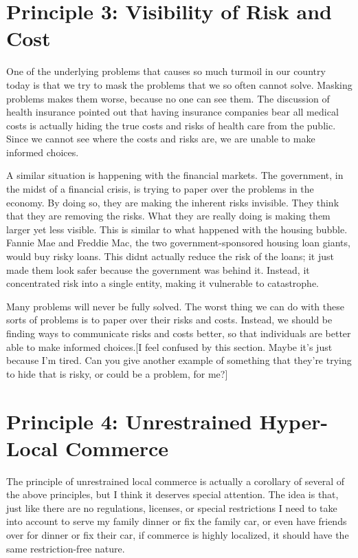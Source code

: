 \section{Principle 3: Visibility of Risk and Cost}

One of the underlying problems that causes so much turmoil in our
country today is that
we try to mask the
problems that we so often cannot solve.  Masking problems makes them
worse, because no one can see them. The discussion of health insurance
pointed out that having insurance companies bear all medical costs is
actually hiding the true costs and risks of health care from the
public. Since we cannot see where the costs and risks are, we are
unable to make informed choices.


A similar situation is happening with the financial markets. The
government, in the midst of
a financial crisis,
is trying to paper over the problems in the economy. By doing so, they
are making the inherent risks invisible. They think that they are
removing the risks. What they are really doing is making them larger
yet less visible. This is similar to what happened with the housing
bubble. Fannie Mae and Freddie Mac, the two government-sponsored
housing loan giants, would buy risky loans. This
didn{\textquotesingle}t actually reduce the risk of the loans; it just
made them look safer because the government was behind it. Instead, it
concentrated risk into a single entity, making it vulnerable to
catastrophe.


Many problems will never be fully solved. The worst thing we can do with
these sorts of problems is to paper over their risks and costs.
Instead, we should be finding ways to communicate risks and costs
better, so that individuals are better able to make informed
choices.[I feel
confused by this section. Maybe it’s just because I’m tired. Can you
give another example of something that they’re trying to hide that is
risky, or could be a problem, for me?]

\section{Principle 4: Unrestrained Hyper-Local Commerce}

The principle of unrestrained local commerce is actually a corollary of
several of the above principles, but I think it deserves special
attention. The idea is that, just like there are no regulations,
licenses, or special restrictions I need to take into account to serve
my family dinner or fix the family car, or even have friends over for
dinner or fix their car, if commerce is highly localized, it should
have the same restriction-free nature.


